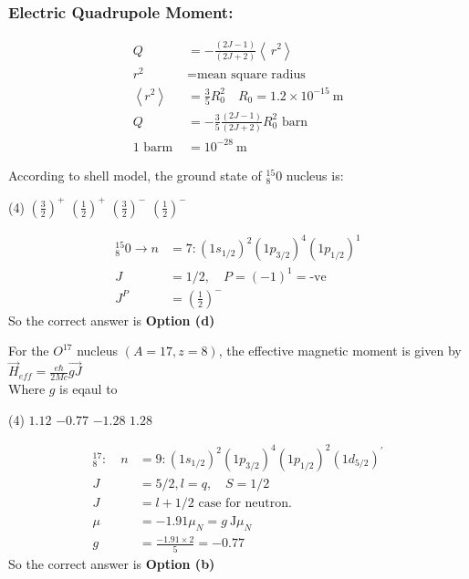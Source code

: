 \subsubsection{Electric Quadrupole Moment:}
\begin{align*}
Q&=-\frac{(2 J-1)}{(2 J+2)}\left\langle\ r^{2}\right\rangle \\
r^{2} &=\text{mean square radius}\\
\left\langle r^{2}\right\rangle&=\frac{3}{5} R_{0}^{2}\quad R_{0}=1.2 \times 10^{-15} \mathrm{~m}\\
Q&=-\frac{3}{5} \frac{(2 J-1)}{(2 J+2)} R_{0}^{2}\text{ barn}\\
1 \text { barm }&=10^{-28} \mathrm{~m}
\end{align*}
\begin{exercise}
	According to shell model, the ground state of ${ }_{8}^{15} 0$ nucleus is:
	\begin{tasks}(4)
		\task[\textbf{a.}]$\left(\frac{3}{2}\right)^{+}$
		\task[\textbf{b.}] $\left(\frac{1}{2}\right)^{+}$
		\task[\textbf{c.}] $\left(\frac{3}{2}\right)^{-}$
		\task[\textbf{d.}] $\left(\frac{1}{2}\right)^{-}$
	\end{tasks}
\end{exercise}
\begin{answer}
	\begin{align*}
	{ }_{8}^{15} 0 \rightarrow n&=7:\left(1 s_{1 / 2}\right)^{2}\left(1 p_{3 / 2}\right)^{4}\left(1 p_{1 / 2}\right)^{1}\\
	J&=1 / 2, \quad P=(-1)^{1}=\text {-ve }\\
	J^{P}&=\left(\frac{1}{2}\right)^{-}
	\end{align*}
	So the correct answer is \textbf{Option (d)}
\end{answer}
\begin{exercise}
	For the $O^{17}$ nucleus $(A=17, z=8)$, the effective magnetic moment is given by \\
	$\vec{H}_{e f f}=\frac{e \hbar}{2 M c} \overrightarrow{g J}$\\
	Where $g$ is eqaul to 
	\begin{tasks}(4)
		\task[\textbf{a.}]$1.12$
		\task[\textbf{b.}] $-0.77$
		\task[\textbf{c.}]$-1.28$
		\task[\textbf{d.}] $1.28$ 
	\end{tasks}
\end{exercise}
\begin{answer}
	\begin{align*}
	{ }_{8}^{17}: \quad n&=9:\left(1 s_{1 / 2}\right)^{2}\left(1 p_{3 / 2}\right)^{4}\left(1 p_{1 / 2}\right)^{2}\left(1 d _{5/2}\right)^{\prime}\\
	J&=5 / 2, l=q, \quad S=1 / 2\\
	J&=l+1 / 2 \text { case for neutron. }\\
	\mu&=-1.91 \mu_{N}=g \mathrm{~J} \mu_{N}\\
	g&=\frac{-1.91 \times 2}{5}=-0.77
	\end{align*}
	So the correct answer is \textbf{Option (b)}
\end{answer}
